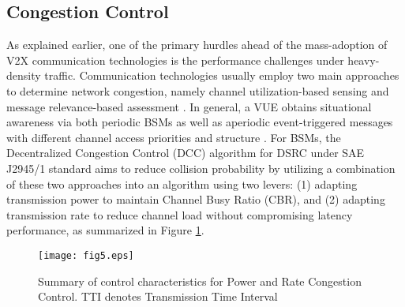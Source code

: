 \documentclass[iicol]{sn-jnl}%
\theoremstyle{thmstyleone}%
\theoremstyle{thmstyletwo}%
\theoremstyle{thmstylethree}%
\begin{document}
\subsection{Congestion Control}\label{subsec5.2}
As explained earlier, one of the primary hurdles ahead of the mass-adoption of V2X communication technologies is the performance challenges under heavy-density traffic. Communication technologies usually employ two main approaches to determine network congestion, namely channel utilization-based sensing \cite{huang2010adaptive} and message relevance-based assessment \cite{kosch2006scalability}. In general, a VUE obtains situational awareness via both periodic BSMs as well as aperiodic event-triggered messages with different channel access priorities and structure \cite{toghi2018multiple}. For BSMs, the Decentralized Congestion Control (DCC) algorithm for DSRC under SAE J2945/1 standard \cite{saej2945} aims to reduce collision probability by utilizing a combination of these two approaches into an algorithm using two levers: (1) adapting transmission power to maintain Channel Busy Ratio (CBR), and (2) adapting transmission rate to reduce channel load without compromising latency performance, as summarized in Figure \ref{fig:Control Characteristics Power, Rate}.

\begin{figure}[b]
\centerline{\texttt{[image: fig5.eps]}}
\caption{Summary of control characteristics for Power and Rate Congestion Control. TTI denotes Transmission Time Interval}
\label{fig:Control Characteristics Power, Rate}
\end{figure}
\end{document}
